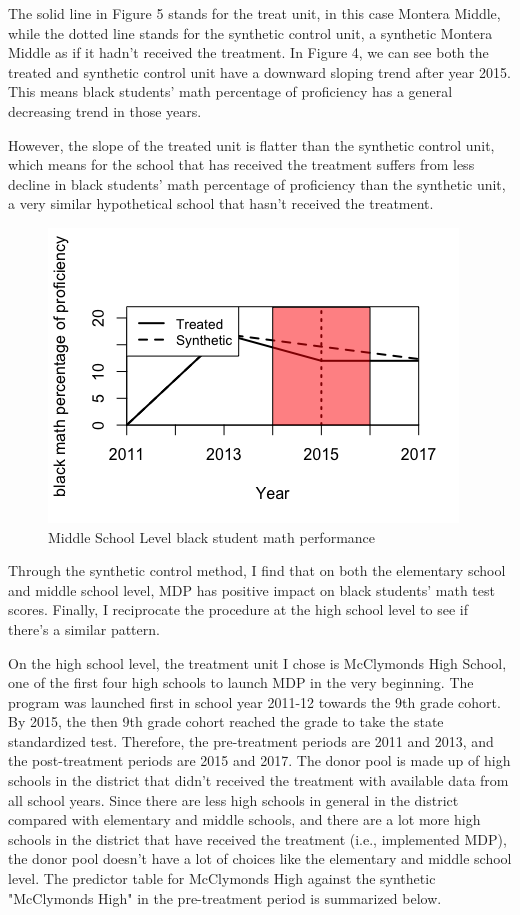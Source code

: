 The solid line in Figure 5 stands for the treat unit, in this case Montera Middle, while the dotted line stands for the synthetic control unit, a synthetic Montera Middle as if it hadn't received the treatment. In Figure 4, we can see both the treated and synthetic control unit have a downward sloping trend after year 2015. This means black students' math percentage of proficiency has a general decreasing trend in those years. 

However, the slope of the treated unit is flatter than the synthetic control unit, which means for the school that has received the treatment suffers from less decline in black students' math percentage of proficiency than the synthetic unit, a very similar hypothetical school that hasn't received the treatment.

\begin{figure}[H]
  \includegraphics[width=\linewidth]{middle1.png}
  \caption{Middle School Level black student math performance}
  \label{fig:boat1}
\end{figure}

Through the synthetic control method, I find that on both the elementary school and middle school level, MDP has positive impact on black students' math test scores. Finally, I reciprocate the procedure at the high school level to see if there's a similar pattern.

On the high school level, the treatment unit I chose is McClymonds High School, one of the first four high schools to launch MDP in the very beginning. The program was launched first in school year 2011-12 towards the 9th grade cohort. By 2015, the then 9th grade cohort reached the grade to take the state standardized test. Therefore, the pre-treatment periods are 2011 and 2013, and the post-treatment periods are 2015 and 2017. The donor pool is made up of high schools in the district that didn't received the treatment with available data from all school years. Since there are less high schools in general in the district compared with elementary and middle schools, and there are a lot more high schools in the district that have received the treatment (i.e., implemented MDP), the donor pool doesn't have a lot of choices like the elementary and middle school level. The predictor table for McClymonds High against the synthetic "McClymonds High" in the pre-treatment period is summarized below. 

